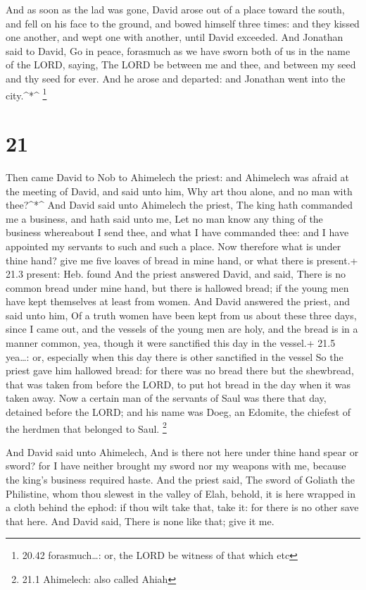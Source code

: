 And as soon as the lad was gone, David arose out of a
place toward the south, and fell on his face to the ground, and bowed
himself three times: and they kissed one another, and wept one with
another, until David exceeded.  And Jonathan said to David,
Go in peace, forasmuch as we have sworn both of us in the name of the
LORD, saying, The LORD be between me and thee, and between my seed and
thy seed for ever. And he arose and departed: and Jonathan went into the
city.\^{}*\^{} \footnote{20.42 forasmuch\ldots: or, the LORD be witness
  of that which etc}

\hypertarget{section-20}{%
\section{21}\label{section-20}}

 Then came David to Nob to Ahimelech the priest: and
Ahimelech was afraid at the meeting of David, and said unto him, Why art
thou alone, and no man with thee?\^{}*\^{}  And David said
unto Ahimelech the priest, The king hath commanded me a business, and
hath said unto me, Let no man know any thing of the business whereabout
I send thee, and what I have commanded thee: and I have appointed my
servants to such and such a place.  Now therefore what is
under thine hand? give me five loaves of bread in mine hand, or what
there is present.+ 21.3 present: Heb. found  And the priest
answered David, and said, There is no common bread under mine hand, but
there is hallowed bread; if the young men have kept themselves at least
from women.  And David answered the priest, and said unto
him, Of a truth women have been kept from us about these three days,
since I came out, and the vessels of the young men are holy, and the
bread is in a manner common, yea, though it were sanctified this day in
the vessel.+ 21.5 yea\ldots: or, especially when this day there is other
sanctified in the vessel  So the priest gave him hallowed
bread: for there was no bread there but the shewbread, that was taken
from before the LORD, to put hot bread in the day when it was taken
away.  Now a certain man of the servants of Saul was there
that day, detained before the LORD; and his name was Doeg, an Edomite,
the chiefest of the herdmen that belonged to Saul. \footnote{21.1
  Ahimelech: also called Ahiah}

 And David said unto Ahimelech, And is there not here under
thine hand spear or sword? for I have neither brought my sword nor my
weapons with me, because the king's business required haste.
 And the priest said, The sword of Goliath the Philistine,
whom thou slewest in the valley of Elah, behold, it is here wrapped in a
cloth behind the ephod: if thou wilt take that, take it: for there is no
other save that here. And David said, There is none like that; give it
me.

